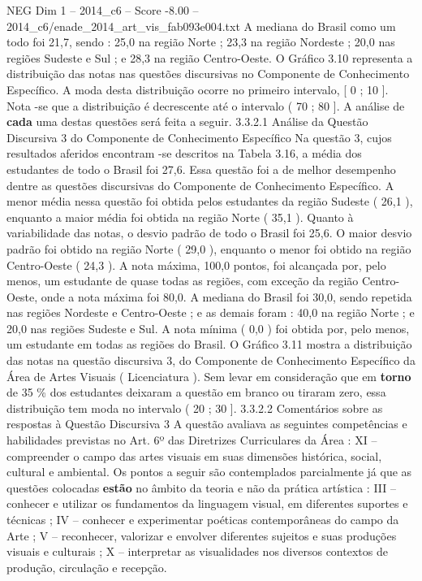 \begin{textsample}{NEG Dim 1 – 2014\_c6 – Score -8.00 – 2014\_c6/enade\_2014\_art\_vis\_fab093e004.txt}
A mediana do Brasil como um todo foi 21,7, sendo : 25,0 na região Norte ; 23,3 na região Nordeste ; 20,0 nas regiões Sudeste e Sul ; e 28,3 na região Centro-Oeste.
O Gráfico 3.10 representa a distribuição das notas nas questões discursivas no Componente de Conhecimento Específico.
A moda desta distribuição ocorre no primeiro intervalo, [ 0 ; 10 ].
Nota -se que a distribuição é decrescente até o intervalo ( 70 ; 80 ].
A análise de \textbf{cada} uma destas questões será feita a seguir. 3.3.2.1 Análise da Questão Discursiva 3 do Componente de Conhecimento Específico Na questão 3, cujos resultados aferidos encontram -se descritos na Tabela 3.16, a média dos estudantes de todo o Brasil foi 27,6.
Essa questão foi a de melhor desempenho dentre as questões discursivas do Componente de Conhecimento Específico.
A menor média nessa questão foi obtida pelos estudantes da região Sudeste ( 26,1 ), enquanto a maior média foi obtida na região Norte ( 35,1 ).
Quanto à variabilidade das notas, o desvio padrão de todo o Brasil foi 25,6.
O maior desvio padrão foi obtido na região Norte ( 29,0 ), enquanto o menor foi obtido na região Centro-Oeste ( 24,3 ).
A nota máxima, 100,0 pontos, foi alcançada por, pelo menos, um estudante de quase todas as regiões, com exceção da região Centro-Oeste, onde a nota máxima foi 80,0.
A mediana do Brasil foi 30,0, sendo repetida nas regiões Nordeste e Centro-Oeste ; e as demais foram : 40,0 na região Norte ; e 20,0 nas regiões Sudeste e Sul.
A nota mínima ( 0,0 ) foi obtida por, pelo menos, um estudante em todas as regiões do Brasil.
O Gráfico 3.11 mostra a distribuição das notas na questão discursiva 3, do Componente de Conhecimento Específico da Área de Artes Visuais ( Licenciatura ).
Sem levar em consideração que em \textbf{torno} de 35 \% dos estudantes deixaram a questão em branco ou tiraram zero, essa distribuição tem moda no intervalo ( 20 ; 30 ]. 3.3.2.2 Comentários sobre as respostas à Questão Discursiva 3 A questão avaliava as seguintes competências e habilidades previstas no Art. 6º das Diretrizes Curriculares da Área : XI – compreender o campo das artes visuais em suas dimensões histórica, social, cultural e ambiental.
Os pontos a seguir são contemplados parcialmente já que as questões colocadas \textbf{estão} no âmbito da teoria e não da prática artística : III – conhecer e utilizar os fundamentos da linguagem visual, em diferentes suportes e técnicas ; IV – conhecer e experimentar poéticas contemporâneas do campo da Arte ; V – reconhecer, valorizar e envolver diferentes sujeitos e suas produções visuais e culturais ; X – interpretar as visualidades nos diversos contextos de produção, circulação e recepção.

\end{textsample}
